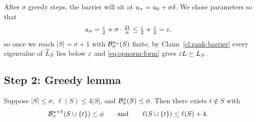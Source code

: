 After $\sigma$ greedy steps, the barrier will sit at $u_\sigma=u_0+\sigma\delta$.
We chose parameters so that
\[
  u_\sigma = \tfrac{\varepsilon}{2} + \sigma\cdot\tfrac{21}{n}
           \le \tfrac{\varepsilon}{2} + \tfrac{\varepsilon}{2} = \varepsilon,
\]
so once we reach $|S|=\sigma+1$ with $\mathcal{B}^{u_\sigma}_{\sigma}(S)$ finite, by
Claim~\ref{cl:rank-barrier} every eigenvalue of $\widetilde{L}_S$ lies below $\varepsilon$ and
\eqref{eq:opnorm-form} gives $\varepsilon L\succeq L_S$.

\subsection*{Step 2: Greedy lemma}

\begin{qsixlemma}\label{lem:greedy}
Suppose $|S|\le\sigma$, $\ell(S)\le 4|S|$, and $\mathcal{B}^{u}_{\sigma}(S)\le\phi$. Then
there exists $t\notin S$ with
\[
  \mathcal{B}^{u+\delta}_{\sigma}(S\cup\{t\})\le\phi
  \qquad\text{and}\qquad
  \ell(S\cup\{t\})\le\ell(S)+4.
\]
\end{qsixlemma}

